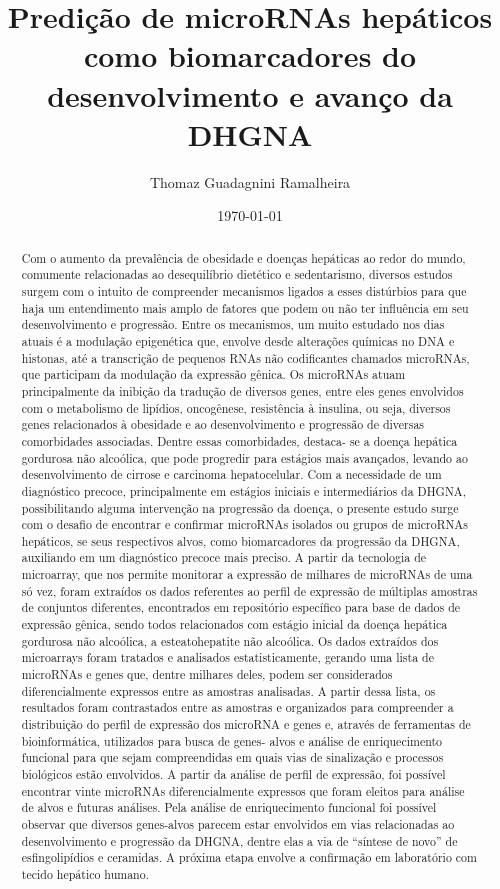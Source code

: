 \documentclass[12pt, a4paper]{article}
\title{Predição de microRNAs hepáticos como biomarcadores do desenvolvimento e avanço da DHGNA}
\author{Thomaz Guadagnini Ramalheira}
\date{\today}
\begin{document}
    \maketitle

    \begin{abstract}
        Com o aumento da prevalência de obesidade e doenças hepáticas ao redor do mundo, comumente relacionadas ao desequilíbrio dietético e sedentarismo, diversos estudos surgem com o intuito de compreender mecanismos ligados a esses distúrbios para que haja um entendimento mais amplo de fatores que podem ou não ter influência em seu desenvolvimento e progressão. Entre os mecanismos, um muito estudado nos dias atuais é a modulação epigenética que, envolve desde alterações químicas no DNA e histonas, até a transcrição de pequenos RNAs não codificantes chamados microRNAs, que participam da modulação da expressão gênica. Os microRNAs atuam principalmente da inibição da tradução de diversos genes, entre eles genes envolvidos com o metabolismo de lipídios, oncogênese, resistência à insulina, ou seja, diversos genes relacionados à obesidade e ao desenvolvimento e progressão de diversas comorbidades associadas. Dentre essas comorbidades, destaca- se a doença hepática gordurosa não alcoólica, que pode progredir para estágios mais avançados, levando ao desenvolvimento de cirrose e carcinoma hepatocelular. Com a necessidade de um diagnóstico precoce, principalmente em estágios iniciais e intermediários da DHGNA, possibilitando alguma intervenção na progressão da doença, o presente estudo surge com o desafio de encontrar e confirmar microRNAs isolados ou grupos de microRNAs hepáticos, se seus respectivos alvos, como biomarcadores da progressão da DHGNA, auxiliando em um diagnóstico precoce mais preciso. A partir da tecnologia de microarray, que nos permite monitorar a expressão de milhares de microRNAs de uma só vez, foram extraídos os dados referentes ao perfil de expressão de múltiplas amostras de conjuntos diferentes, encontrados em repositório específico para base de dados de expressão gênica, sendo todos relacionados com estágio inicial da doença hepática gordurosa não alcoólica, a esteatohepatite não alcoólica. Os dados extraídos dos microarrays foram tratados e analisados estatisticamente, gerando uma lista de microRNAs e genes que, dentre milhares deles, podem ser considerados diferencialmente expressos entre as amostras analisadas. A partir dessa lista, os resultados foram contrastados entre as amostras e organizados para compreender a distribuição do perfil de expressão dos microRNA e genes e, através de ferramentas de bioinformática, utilizados para busca de genes- alvos e análise de enriquecimento funcional para que sejam compreendidas em quais vias de sinalização e processos biológicos estão envolvidos. A partir da análise de perfil de expressão, foi possível encontrar vinte microRNAs diferencialmente expressos que foram eleitos para análise de alvos e futuras análises. Pela análise de enriquecimento funcional foi possível observar que diversos genes-alvos parecem estar envolvidos em vias relacionadas ao desenvolvimento e progressão da DHGNA, dentre elas a via de “síntese de novo” de esfingolipídios e ceramidas. A próxima etapa envolve a confirmação em laboratório com tecido hepático humano.

\end{abstract}
\end{document}
